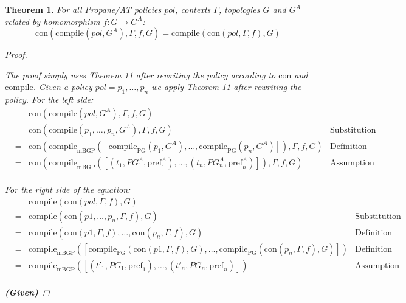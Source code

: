 \documentclass[twocolumn, openany]{sig-alternate-10pt}
\newcommand{\sysname}{{\small \sf Propane/AT}\xspace}
\newcommand{\Con}{\mathrm{con}}
\newcommand{\CompilePg}{\ensuremath{\mathrm{compile}_\mathrm{PG}}}
\newcommand{\CompileMbgp}{\ensuremath{\mathrm{compile}_\mathrm{mBGP}}}
\newcommand{\Compile}{\ensuremath{\mathrm{compile}}}
\newcommand{\Pref}{\ensuremath{\mathrm{pref}}}
\newtheorem{thm}{Theorem}
\begin{document}
\vspace{2em}
\begin{thm}
  For all \sysname policies $pol$, contexts $\Gamma$, topologies $G$ and $G^A$ related by homomorphism $f : G \rightarrow G^A$:
  $$\Con(\Compile(pol,G^A),\Gamma,f,G) = \Compile(\Con(pol,\Gamma,f),G)$$

  \begin{proof} 
    $ $

    \vspace{.5em}
    \noindent
    The proof simply uses Theorem 11 after rewriting the policy according to $\Con$ and $\Compile$.
    Given a policy $pol = p_1, \ldots, p_n$ we apply Theorem 11 after rewriting the policy. For the left side:
    \[
    \begin{array}{llll}
      & & \Con(\Compile(pol,G^A),\Gamma,f,G) \\
      &=& \Con(\Compile(p_1, \ldots, p_n, G^A),\Gamma,f,G) & \text{Substitution} \\
      &=& \Con(\CompileMbgp([\CompilePg(p_1, G^A), \ldots, \CompilePg(p_n, G^A)]),\Gamma,f,G)
            & \text{Definition of Compile} \\
      &=& \Con(\CompileMbgp([(t_1,PG^A_1,\Pref^A_1), \ldots, (t_n,PG^A_n,\Pref^A_n)]),\Gamma,f,G)
            & \text{Assumption}\\
    \end{array}
    \]

    \vspace{.5em}
    \noindent
    For the right side of the equation:
    \[
    \begin{array}{llll}
      & & \Compile(\Con(pol,\Gamma,f),G) \\
      &=& \Compile(\Con(p1,\dots,p_n, \Gamma,f), G) 
            & \text{Substitution} \\
      &=& \Compile(\Con(p1, \Gamma, f),\dots, \Con(p_n, \Gamma,f), G) 
            & \text{Definition of con} \\
      &=& \CompileMbgp([\CompilePg(\Con(p1, \Gamma, f),G), \ldots, \CompilePg(\Con(p_n, \Gamma, f),G)]) 
            & \text{Definition of compile} \\

      &=& \CompileMbgp([(t'_1, PG_1, \Pref_1), \ldots, (t'_n, PG_n, \Pref_n)])
            & \text{Assumption} \\

    \end{array}
    \]


    \vspace{1em}
    \noindent
    \textbf{(Given)}


\end{proof}
\end{thm}
\end{document}
